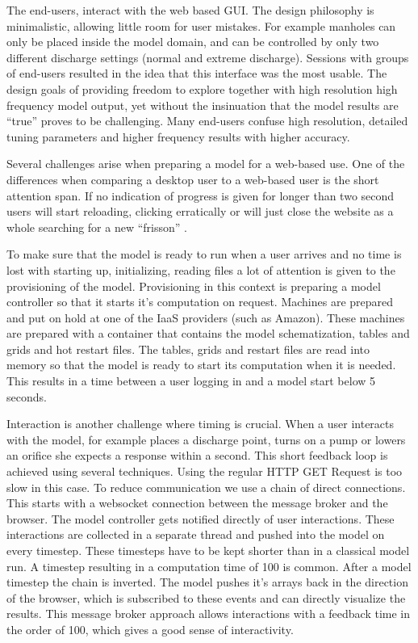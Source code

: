 \documentclass[a4paper]{article}
\begin{document}
The end-users, interact with the web based \ac{GUI}. The design philosophy is minimalistic, allowing little room for user mistakes. For example manholes can only be placed inside the model domain, and can be controlled by only two different discharge settings (normal and extreme discharge). Sessions with groups of end-users resulted in the idea that this interface was the most usable. The design goals of providing freedom to explore together with high resolution high frequency model output, yet without the insinuation that the model results are ``true'' proves to be challenging. Many end-users confuse high resolution, detailed tuning parameters and higher frequency results with higher accuracy.

Several challenges arise when preparing a model for a web-based use. One of the differences when comparing a desktop user to a web-based user is the short attention span. If no indication of progress is given for longer than two second users will start reloading, clicking erratically or will just close the website as a whole searching for a new ``frisson'' \citep{Carr2011}.

To make sure that the model is ready to run when a user arrives and no time is lost with starting up, initializing, reading files a lot of attention is given to the provisioning of the model. Provisioning in this context is preparing a model controller so that it starts it's computation on request. Machines are prepared and put on hold at one of the \ac{IaaS} providers (such as Amazon). These machines are prepared with a container that contains the model schematization, tables and grids and hot restart files. The tables, grids and restart files are read into memory so that the model is ready to start its computation when it is needed. This results in a time between a user logging in and a model start below 5 seconds.

Interaction is another challenge where timing is crucial. When a user interacts with the model, for example places a discharge point, turns on a pump or lowers an orifice she expects a response within a second. This short feedback loop is achieved using several techniques. Using the regular \ac{HTTP} GET Request is too slow in this case. To reduce communication we use a chain of direct connections. This starts with a websocket \citep{w3c2010} connection between the message broker and the browser. The model controller gets notified directly of user interactions. These interactions are collected in a separate thread and pushed into the model on every timestep. These timesteps have to be kept shorter than in a classical model run. A timestep resulting in a computation time of \si{100}{\mili\second} is common. After a model timestep the chain is inverted. The model pushes it's arrays back in the direction of the browser, which is subscribed to these events and can directly visualize the results. This message broker approach allows interactions with a feedback time in the order of \si{100}{\mili\second}, which gives a good sense of interactivity.
\end{document}
